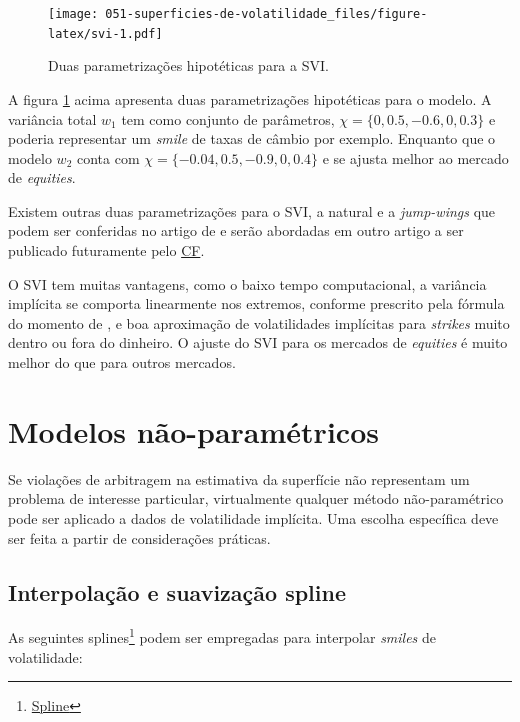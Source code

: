 \documentclass[]{book}
\let\rmarkdownfootnote\footnote%
\def\footnote{\protect\rmarkdownfootnote}
\theoremstyle{definition}
\theoremstyle{definition}
\theoremstyle{definition}
\theoremstyle{remark}
\begin{document}
\begin{figure}
\centering
\texttt{[image: 051-superficies-de-volatilidade\_files/figure-latex/svi-1.pdf]}
\caption{\label{fig:svi}Duas parametrizações hipotéticas para a SVI.}
\end{figure}

A figura \ref{fig:svi} acima apresenta duas parametrizações hipotéticas para o modelo. A variância total \(w_1\) tem como conjunto de parâmetros, \(\chi = \{0, 0.5, -0.6, 0, 0.3\}\) e poderia representar um \emph{smile} de taxas de câmbio por exemplo. Enquanto que o modelo \(w_2\) conta com \(\chi = \{-0.04, 0.5, -0.9, 0, 0.4\}\) e se ajusta melhor ao mercado de \emph{equities}.

Existem outras duas parametrizações para o SVI, a natural e a \emph{jump-wings} que podem ser conferidas no artigo de \citet{Gatheral2014} e serão abordadas em outro artigo a ser publicado futuramente pelo \href{https://clubedefinancas.com.br}{CF}.

O SVI tem muitas vantagens, como o baixo tempo computacional, a variância implícita se comporta linearmente nos extremos, conforme prescrito pela fórmula do momento de \citet{Lee2004}, e boa aproximação de volatilidades implícitas para \emph{strikes} muito dentro ou fora do dinheiro. O ajuste do SVI para os mercados de \emph{equities} é muito melhor do que para outros mercados.

\hypertarget{modelos-nao-parametricos}{%
\section{Modelos não-paramétricos}\label{modelos-nao-parametricos}}

Se violações de arbitragem na estimativa da superfície não representam um problema de interesse particular, virtualmente qualquer método não-paramétrico pode ser aplicado a dados de volatilidade implícita. Uma escolha específica deve ser feita a partir de considerações práticas.

\hypertarget{interpolacao-e-suavizacao-spline}{%
\subsection{Interpolação e suavização spline}\label{interpolacao-e-suavizacao-spline}}

As seguintes splines\footnote{\href{https://en.wikipedia.org/wiki/Spline_interpolation}{Spline}} podem ser empregadas para interpolar \emph{smiles} de volatilidade:
\end{document}
